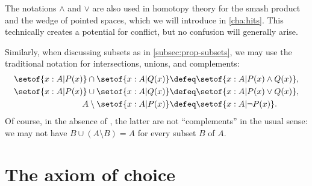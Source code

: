 The notations $\land$ and $\lor$ are also used in homotopy theory for the smash product and the wedge of pointed spaces, which we will introduce in \cref{cha:hits}.
This technically creates a potential for conflict, but no confusion will generally arise.

Similarly, when discussing subsets as in \cref{subsec:prop-subsets}, we may use the traditional notation for intersections, unions, and complements:
%
%
%
%
%
%
\begin{align*}
  \setof{x:A | P(x)} \cap \setof{x:A | Q(x)}
  &\defeq \setof{x:A | P(x) \land Q(x)},\\
  \setof{x:A | P(x)} \cup \setof{x:A | Q(x)}
  &\defeq \setof{x:A | P(x) \lor Q(x)},\\
  A \setminus \setof{x:A | P(x)}
  &\defeq \setof{x:A | \neg P(x)}.
\end{align*}
Of course, in the absence of \LEM{}, the latter are not ``complements'' in the usual sense: we may not have $B \cup (A\setminus B) = A$ for every subset $B$ of $A$.

%
%
%


\section{The axiom of choice}
\label{sec:axiom-choice}

